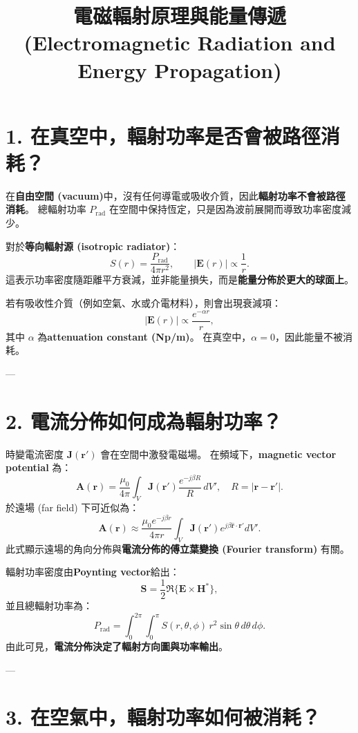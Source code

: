 \documentclass[12pt,a4paper]{article}
\title{電磁輻射原理與能量傳遞 (Electromagnetic Radiation and Energy Propagation)}
\author{}
\date{}
\begin{document}
\maketitle

\section*{1. 在真空中，輻射功率是否會被路徑消耗？}

在\textbf{自由空間 (vacuum)}中，沒有任何導電或吸收介質，因此\textbf{輻射功率不會被路徑消耗}。  
總輻射功率 \( P_{\text{rad}} \) 在空間中保持恆定，只是因為波前展開而導致功率密度減少。

對於\textbf{等向輻射源 (isotropic radiator)}：
\[
S(r) = \frac{P_{\text{rad}}}{4\pi r^2}, \qquad |\mathbf{E}(r)| \propto \frac{1}{r}.
\]
這表示功率密度隨距離平方衰減，並非能量損失，而是\textbf{能量分佈於更大的球面上}。

若有吸收性介質（例如空氣、水或介電材料），則會出現衰減項：
\[
|\mathbf{E}(r)| \propto \frac{e^{-\alpha r}}{r},
\]
其中 \(\alpha\) 為\textbf{attenuation constant (Np/m)}。  
在真空中，\(\alpha = 0\)，因此能量不被消耗。

---

\section*{2. 電流分佈如何成為輻射功率？}

時變電流密度 \( \mathbf{J}(\mathbf{r}') \) 會在空間中激發電磁場。  
在頻域下，\textbf{magnetic vector potential} 為：
\[
\mathbf{A}(\mathbf{r}) = \frac{\mu_0}{4\pi}
\int_V \mathbf{J}(\mathbf{r}') \frac{e^{-j\beta R}}{R} \, dV', 
\quad R = |\mathbf{r} - \mathbf{r}'|.
\]
於遠場 (far field) 下可近似為：
\[
\mathbf{A}(\mathbf{r}) \approx 
\frac{\mu_0 e^{-j\beta r}}{4\pi r}
\int_V \mathbf{J}(\mathbf{r}') e^{j\beta \hat{\mathbf{r}}\cdot \mathbf{r}'} dV'.
\]
此式顯示遠場的角向分佈與\textbf{電流分佈的傅立葉變換 (Fourier transform)} 有關。  

輻射功率密度由\textbf{Poynting vector}給出：
\[
\mathbf{S} = \frac{1}{2}\Re\{\mathbf{E}\times\mathbf{H}^*\},
\]
並且總輻射功率為：
\[
P_{\text{rad}} = \int_0^{2\pi}\!\!\int_0^\pi
S(r,\theta,\phi)\,r^2\sin\theta\,d\theta\,d\phi.
\]
由此可見，\textbf{電流分佈決定了輻射方向圖與功率輸出}。

---

\section*{3. 在空氣中，輻射功率如何被消耗？}
\end{document}
